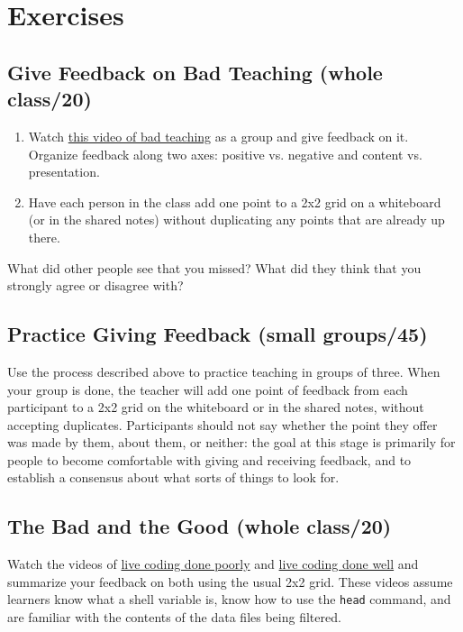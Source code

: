 \section{Exercises}\label{s:performance-exercises}

\subsection*{Give Feedback on Bad Teaching (whole class/20)}

\begin{enumerate}
\item
  Watch \href{https://www.youtube.com/watch?v=-ApVt04rB4U}{this video of bad teaching} as a group
  and give feedback on it. Organize feedback along two axes: positive
  vs. negative and content vs. presentation.
\item
  Have each person in the class add one point to a 2x2 grid on a
  whiteboard (or in the shared notes) without duplicating any points
  that are already up there.
\end{enumerate}

What did other people see that you missed? What did they think that you
strongly agree or disagree with?

\subsection*{Practice Giving Feedback (small groups/45)}

Use the process described above to practice teaching in groups of
three. When your group is done, the teacher will add one point of
feedback from each participant to a 2x2 grid on the whiteboard or in
the shared notes, without accepting duplicates. Participants should
not say whether the point they offer was made by them, about them, or
neither: the goal at this stage is primarily for people to become
comfortable with giving and receiving feedback, and to establish a
consensus about what sorts of things to look for.

\subsection*{The Bad and the Good (whole class/20)}

Watch the videos of \href{https://youtu.be/bXxBeNkKmJE}{live coding done poorly}
and \href{https://youtu.be/SkPmwe\_WjeY}{live coding done well} and summarize your
feedback on both using the usual 2x2 grid. These videos assume
learners know what a shell variable is, know how to use the \texttt{head}
command, and are familiar with the contents of the data files being
filtered.

